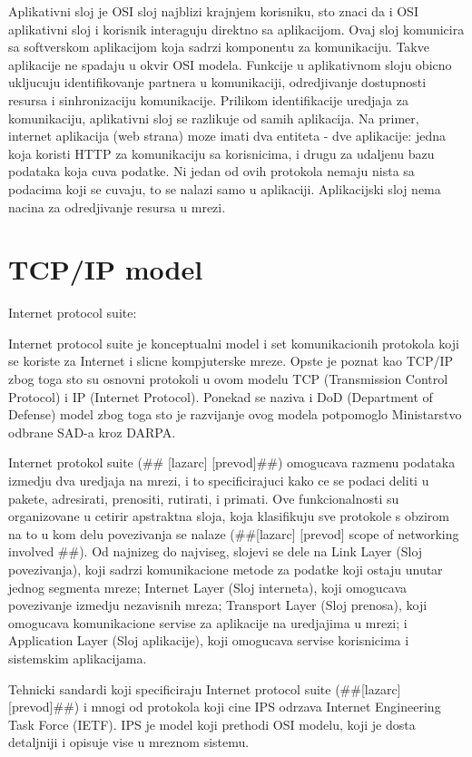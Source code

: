 \documentclass[a4paper,12pt, master]{etf}
\begin{document}
	Aplikativni sloj je OSI sloj najblizi krajnjem korisniku, sto znaci da i OSI aplikativni sloj i
	korisnik interaguju direktno sa aplikacijom. Ovaj sloj komunicira sa softverskom aplikacijom
	koja sadrzi komponentu za komunikaciju. Takve aplikacije ne spadaju u okvir OSI modela.
	Funkcije u aplikativnom sloju obicno ukljucuju identifikovanje partnera u komunikaciji,
	odredjivanje dostupnosti resursa i sinhronizaciju komunikacije. Prilikom identifikacije
	uredjaja za komunikaciju, aplikativni sloj se razlikuje od samih aplikacija. Na primer,
	internet aplikacija (web strana) moze imati dva entiteta - dve aplikacije: jedna koja koristi
	HTTP za komunikaciju sa korisnicima, i drugu za udaljenu bazu podataka koja cuva podatke. Ni
	jedan od ovih protokola nemaju nista sa podacima koji se cuvaju, to se nalazi samo u
	aplikaciji. Aplikacijski sloj nema nacina za odredjivanje resursa u mrezi.

	\section{TCP/IP model}
	Internet protocol suite:

	Internet protocol suite je konceptualni model i set komunikacionih protokola koji se koriste za
	Internet i slicne kompjuterske mreze. Opste je poznat kao TCP/IP zbog toga sto su osnovni
	protokoli u ovom modelu TCP (Transmission Control Protocol) i IP (Internet Protocol). Ponekad
	se naziva i DoD (Department of Defense) model zbog toga sto je razvijanje ovog modela
	potpomoglo Ministarstvo odbrane SAD-a kroz DARPA.

	Internet protokol suite (\#\# [lazarc] [prevod]\#\#) omogucava razmenu podataka izmedju dva
	uredjaja na mrezi, i to specificirajuci kako ce se podaci deliti u pakete, adresirati,
	prenositi, rutirati, i primati. Ove funkcionalnosti su organizovane u cetirir apstraktna sloja,
	koja klasifikuju sve protokole s obzirom na to u kom delu povezivanja se nalaze (\#\#[lazarc]
	[prevod] scope of networking involved \#\#). Od najnizeg do najviseg, slojevi se dele na Link
	Layer (Sloj povezivanja), koji sadrzi komunikacione metode za podatke koji ostaju unutar jednog
	segmenta mreze; Internet Layer (Sloj interneta), koji omogucava povezivanje izmedju nezavisnih
	mreza; Transport Layer (Sloj prenosa), koji omogucava komunikacione servise za aplikacije na
	uredjajima u mrezi; i Application Layer (Sloj aplikacije), koji omogucava servise korisnicima i
	sistemskim aplikacijama.

	Tehnicki sandardi koji specificiraju Internet protocol suite (\#\#[lazarc] [prevod]\#\#) i mnogi od
	protokola koji cine IPS odrzava Internet Engineering Task Force (IETF). IPS je model koji
	prethodi OSI modelu, koji je dosta detaljniji i opisuje vise u mreznom sistemu.
\end{document}
